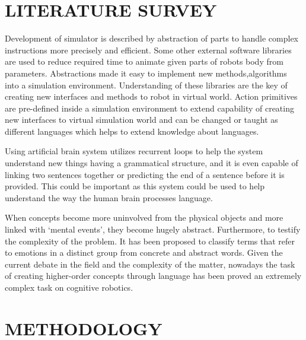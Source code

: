 \documentclass[12pt]{report}
\begin{document}
\chapter{LITERATURE SURVEY}

Development of simulator is described by abstraction of parts to handle complex instructions more precisely and efficient. Some other external software libraries are used to reduce required time to animate given parts of robots body from parameters. Abstractions made it easy to implement new methods,algorithms into a simulation environment. Understanding of these libraries are the key of creating new interfaces and methods to robot in virtual world.
Action primitives are pre-defined inside a simulation environment to extend capability of creating new interfaces to virtual simulation world and can be changed or taught as different languages which helps to extend knowledge about languages.\cite{angelo}

Using artificial brain system utilizes recurrent loops to help the system understand new things having a grammatical structure, and it is even capable of linking two sentences together or predicting the end of a sentence before it is provided. This could be important as this system could be used to help understand the way the human brain processes language.\cite{xavier}

When concepts become more uninvolved from the physical objects and more linked with ‘mental events’, they become hugely abstract. Furthermore, to testify the complexity of the problem. It has been proposed to classify terms that refer to emotions in a distinct group from concrete and abstract words. Given the current debate in the field and the complexity of the matter, nowadays the task of creating higher-order concepts through language has been proved an extremely complex task on cognitive robotics.\cite{venuto}
\newpage


\chapter{METHODOLOGY}
\end{document}
